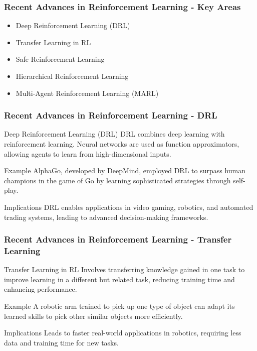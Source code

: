\documentclass[aspectratio=169]{beamer}
\begin{document}
\begin{frame}[fragile]
    \frametitle{Recent Advances in Reinforcement Learning - Key Areas}
    \begin{itemize}
        \item Deep Reinforcement Learning (DRL)
        \item Transfer Learning in RL
        \item Safe Reinforcement Learning
        \item Hierarchical Reinforcement Learning
        \item Multi-Agent Reinforcement Learning (MARL)
    \end{itemize}
\end{frame}

\begin{frame}[fragile]
    \frametitle{Recent Advances in Reinforcement Learning - DRL}
    \begin{block}{Deep Reinforcement Learning (DRL)}
        DRL combines deep learning with reinforcement learning. Neural networks are used as function approximators, allowing agents to learn from high-dimensional inputs.
    \end{block}
    \begin{exampleblock}{Example}
        AlphaGo, developed by DeepMind, employed DRL to surpass human champions in the game of Go by learning sophisticated strategies through self-play.
    \end{exampleblock}
    \begin{block}{Implications}
        DRL enables applications in video gaming, robotics, and automated trading systems, leading to advanced decision-making frameworks.
    \end{block}
\end{frame}

\begin{frame}[fragile]
    \frametitle{Recent Advances in Reinforcement Learning - Transfer Learning}
    \begin{block}{Transfer Learning in RL}
        Involves transferring knowledge gained in one task to improve learning in a different but related task, reducing training time and enhancing performance.
    \end{block}
    \begin{exampleblock}{Example}
        A robotic arm trained to pick up one type of object can adapt its learned skills to pick other similar objects more efficiently.
    \end{exampleblock}
    \begin{block}{Implications}
        Leads to faster real-world applications in robotics, requiring less data and training time for new tasks.
    \end{block}
\end{frame}
\end{document}
